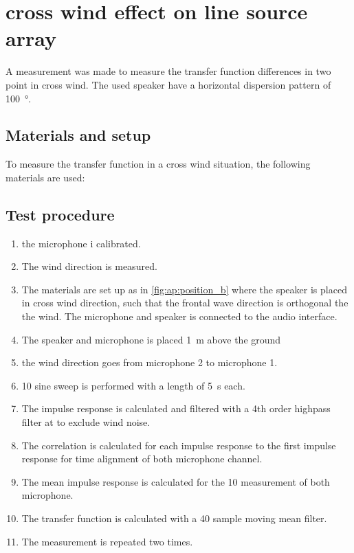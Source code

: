 \chapter{cross wind effect on line source array}\label{ch:ap:measurement_two}
A measurement was made to measure the transfer function differences in two point in cross wind. The used speaker have a horizontal dispersion pattern of \SI{100}{\degree}. 


\section*{Materials and setup}
To measure the transfer function in a cross wind situation, the following materials are used:

\startequipment
{}
\stopequipment


\section*{Test procedure}


\begin{enumerate}
\item the microphone i calibrated.
\item The wind direction is measured.
\item The materials are set up as in \autoref{fig:ap:position_b} where the speaker is placed in cross wind direction, such that the frontal wave direction is orthogonal the the wind. The microphone and speaker is connected to the audio interface.
\item The speaker and microphone is placed \SI{1}{\meter} above the ground
\item the wind direction goes from microphone 2 to microphone 1.
\item 10 sine sweep is performed with a length of \SI{5}{\second} each. 
\item The impulse response is calculated and filtered with a 4th order highpass filter at  to exclude wind noise.
\item The correlation is calculated for each impulse response to the first impulse response for time alignment \citep{gunness2001loudspeaker} of both microphone channel.
\item The mean impulse response is calculated for the 10 measurement of both microphone.
\item The transfer function is calculated with a 40 sample moving mean filter.
\item The measurement is repeated two times.
\end{enumerate}


